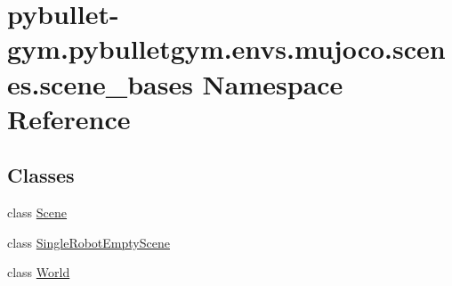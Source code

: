 \hypertarget{namespacepybullet-gym_1_1pybulletgym_1_1envs_1_1mujoco_1_1scenes_1_1scene__bases}{}\section{pybullet-\/gym.pybulletgym.\+envs.\+mujoco.\+scenes.\+scene\+\_\+bases Namespace Reference}
\label{namespacepybullet-gym_1_1pybulletgym_1_1envs_1_1mujoco_1_1scenes_1_1scene__bases}
\subsection*{Classes}
\begin{DoxyCompactItemize}
\item 
class \hyperlink{classpybullet-gym_1_1pybulletgym_1_1envs_1_1mujoco_1_1scenes_1_1scene__bases_1_1_scene}{Scene}
\item 
class \hyperlink{classpybullet-gym_1_1pybulletgym_1_1envs_1_1mujoco_1_1scenes_1_1scene__bases_1_1_single_robot_empty_scene}{Single\+Robot\+Empty\+Scene}
\item 
class \hyperlink{classpybullet-gym_1_1pybulletgym_1_1envs_1_1mujoco_1_1scenes_1_1scene__bases_1_1_world}{World}
\end{DoxyCompactItemize}
